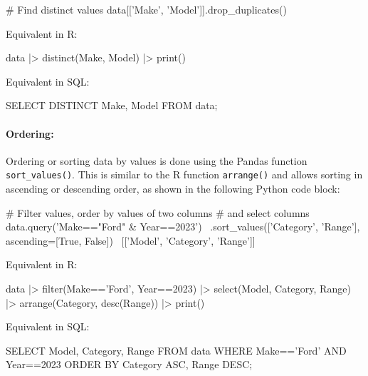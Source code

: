 \begin{pythoncode}
# Find distinct values
data[['Make', 'Model']].drop_duplicates()
\end{pythoncode}

\begin{multicols}{2}

Equivalent in R:

\begin{Rcode}
data |> 
  distinct(Make, Model) |>
  print()
\end{Rcode}

Equivalent in SQL:

\begin{sqlcode}
SELECT DISTINCT Make, Model 
  FROM data;
\end{sqlcode}
\end{multicols}

\paragraph*{Ordering:} Ordering or sorting data by values is done using the Pandas function \texttt{sort\_values()}. This is similar to the R function \texttt{arrange()} and allows sorting in ascending or descending order, as shown in the following Python code block:

\begin{samepage}
\begin{pythoncode}
# Filter values, order by values of two columns
# and select columns
data.query('Make=="Ford" & Year==2023') \
    .sort_values(['Category', 'Range'], ascending=[True, False]) \
    [['Model', 'Category', 'Range']]
\end{pythoncode}
\end{samepage}

\begin{multicols}{2}
Equivalent in R:
\begin{Rcode}
data |> 
  filter(Make=='Ford', 
         Year==2023) |> 
  select(Model, Category, 
         Range) |>
  arrange(Category, 
          desc(Range)) |>
  print()
\end{Rcode}

Equivalent in SQL:

\begin{sqlcode}
SELECT Model, Category, Range
   FROM data 
   WHERE Make=='Ford' AND 
         Year==2023
   ORDER BY Category ASC, 
            Range DESC;
\end{sqlcode}
\end{multicols}

